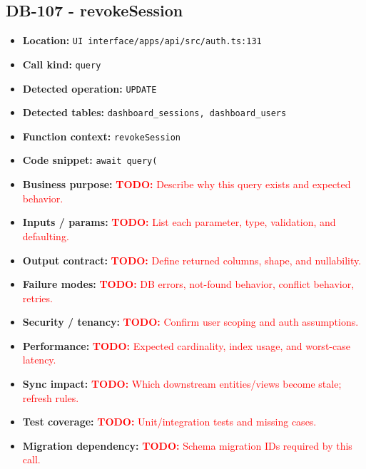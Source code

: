 \documentclass[11pt]{article}
\newcommand{\todoitem}[1]{\textcolor{red}{\textbf{TODO:} #1}}
\begin{document}
\subsection{DB-107 - revokeSession}
\begin{itemize}[leftmargin=1.5em]
\item \textbf{Location:} \texttt{UI interface/apps/api/src/auth.ts:131}
\item \textbf{Call kind:} \texttt{query}
\item \textbf{Detected operation:} \texttt{UPDATE}
\item \textbf{Detected tables:} \texttt{dashboard\_sessions, dashboard\_users}
\item \textbf{Function context:} \texttt{revokeSession}
\item \textbf{Code snippet:} \texttt{await query(}
\item \textbf{Business purpose:} \todoitem{Describe why this query exists and expected behavior.}
\item \textbf{Inputs / params:} \todoitem{List each parameter, type, validation, and defaulting.}
\item \textbf{Output contract:} \todoitem{Define returned columns, shape, and nullability.}
\item \textbf{Failure modes:} \todoitem{DB errors, not-found behavior, conflict behavior, retries.}
\item \textbf{Security / tenancy:} \todoitem{Confirm user scoping and auth assumptions.}
\item \textbf{Performance:} \todoitem{Expected cardinality, index usage, and worst-case latency.}
\item \textbf{Sync impact:} \todoitem{Which downstream entities/views become stale; refresh rules.}
\item \textbf{Test coverage:} \todoitem{Unit/integration tests and missing cases.}
\item \textbf{Migration dependency:} \todoitem{Schema migration IDs required by this call.}
\end{itemize}
\end{document}
